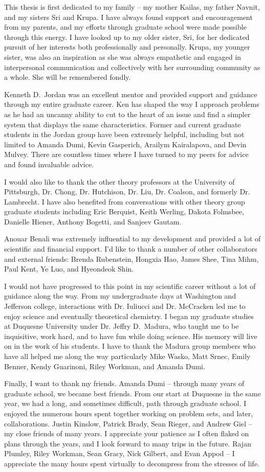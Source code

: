 This thesis is first dedicated to my family -- my mother Kailas, my father Navnit, and my sisters Sri and Krupa.
I have always found support and encouragement from my parents, and my efforts through graduate school were made possible through this energy.
I have looked up to my older sister, Sri, for her dedicated pursuit of her interests both professionally and personally.
Krupa, my younger sister, was also an inspiration as she was always empathetic and engaged in interpersonal communication and collectively with her surrounding community as a whole.
She will be remembered fondly.

Kenneth D.~Jordan was an excellent mentor and provided support and guidance through my entire graduate career.
Ken has shaped the way I approach problems as he had an uncanny ability to cut to the heart of an issue and find a simpler system that displays the same characteristics.
Former and current graduate students in the Jordan group have been extremely helpful, including but not limited to Amanda Dumi, Kevin Gasperich, Arailym Kairalapova, and Devin Mulvey.
There are countless times where I have turned to my peers for advice and found invaluable advice.

I would also like to thank the other theory professors at the University of Pittsburgh, Dr. Chong, Dr. Hutchison, Dr. Liu, Dr. Coalson, and formerly Dr. Lambrecht.
I have also benefited from conversations with other theory group graduate students including Eric Berquist, Keith Werling, Dakota Folmsbee, Danielle Hiener, Anthony Bogetti, and Sanjeev Gautam.

Anouar Benali was extremely influential to my development and provided a lot of scientific and financial support.
I'd like to thank a number of other collaborators and external friends: Brenda Rubenstein, Hongxia Hao, James Shee, Tina Mihm, Paul Kent, Ye Luo, and Hyeondeok Shin.

I would not have progressed to this point in my scientific career without a lot of guidance along the way.
From my undergraduate days at Washington and Jefferson college, interactions with Dr. Iuliucci and Dr. McCracken led me to enjoy science and eventually theoretical chemistry.
I began my graduate studies at Duquesne University under Dr. Jeffry D.~Madura, who taught me to be inquisitive, work hard, and to have fun while doing science.
His memory will live on in the work of his students.
I have to thank the Madura group members who have all helped me along the way particularly Mike Wasko, Matt Srnec, Emily Benner, Kendy Guarinoni, Riley Workman, and Amanda Dumi.

Finally, I want to thank my friends.
Amanda Dumi -- through many years of graduate school, we became best friends.
From our start at Duquesne in the same year, we had a long, and sometimes difficult, path through graduate school.
I enjoyed the numerous hours spent together working on problem sets, and later, collaborations.
Justin Kinslow, Patrick Brady, Sean Rieger, and Andrew Giel -- my close friends of many years.
I appreciate your patience as I often flaked on plans through the years, and I look forward to many trips in the future.
Rajan Plumley, Riley Workman, Sean Gracy, Nick Gilbert, and Evan Appod -- I appreciate the many hours spent virtually to decompress from the stresses of life.
